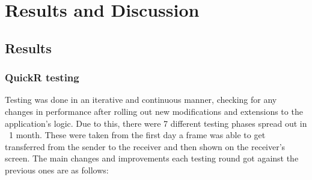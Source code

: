 \documentclass{article}
\begin{document}
\section{Results and Discussion}
\label{sec:results}

\subsection{Results}
\subsubsection{QuickR testing}
Testing was done in an iterative and continuous manner, checking for any changes in performance after rolling out new modifications and extensions to the application's logic. Due to this, there were 7 different testing phases spread out in ~1 month. These were taken from the first day a frame was able to get transferred from the sender to the receiver and then shown on the receiver's screen. The main changes and improvements each testing round got against the previous ones are as follows:
\end{document}
